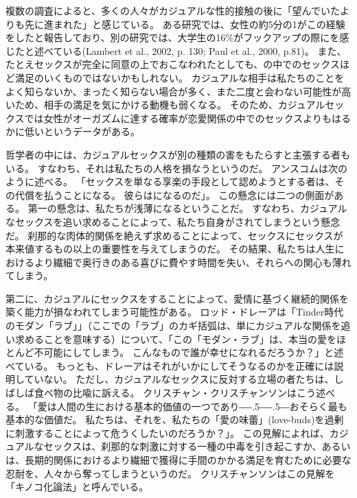 \documentclass[paper=a4,book,openany]{jlreq}
\def\DDASH{―\kern-.5\zw―\kern-.5\zw―} %
\begin{document}
複数の調査によると、多くの人々がカジュアルな性的接触の後に「望んでいたよりも先に進まれた」と感じている。
ある研究では、女性の約5分の1がこの経験をしたと報告しており、別の研究では、大学生の16\%がフックアップの際にを感じたと述べている(Lambert et al., 2002, p. 130; Paul et al., 2000, p.81)。
\nocite{lambert02:_plur_ignor_hook_up}\nocite{paul00:_hook}
また、たとえセックスが完全に同意の上でおこなわれたとしても、の中でのセックスほど満足のいくものではないかもしれない。
カジュアルな相手は私たちのことをよく知らないか、まったく知らない場合が多く、また二度と会わない可能性が高いため、相手の満足を気にかける動機も弱くなる。
そのため、カジュアルセックスでは女性がオーガズムに達する確率が恋愛関係の中でのセックスよりもはるかに低いというデータがある\citep{armstrong10:_orgas_coll_hook_relat}。

哲学者の中には、カジュアルセックスが別の種類の害をもたらすと主張する者もいる。
すなわち、それは私たちの人格を損なうというのだ。
アンスコムは次のように述べる。
「セックスを単なる享楽の手段として認めようとする者は、その代償を払うことになる。
彼らはになるのだ」\citep{anscombe72contraception}。
この懸念には二つの側面がある。
第一の懸念は、私たちが浅薄になるということだ。
すなわち、カジュアルなセックスを追い求めることによって、私たち自身がされてしまうという懸念だ。
刹那的な肉体的関係を絶えず求めることによって、セックスにセックスが本来値するもの以上の重要性を与えてしまうのだ。
その結果、私たちは人生におけるより繊細で奥行きのある喜びに費やす時間を失い、それらへの関心も薄れてしまう。

第二に、カジュアルにセックスをすることによって、愛情に基づく継続的関係を築く能力が損なわれてしまう可能性がある。
ロッド・ドレーアは「Tinder時代のモダン「ラブ」」（ここでの「ラブ」のカギ括弧は、単にカジュアルな関係を追い求めることを意味する）について、「この「モダン・ラブ」は、本当の愛をほとんど不可能にしてしまう。
こんなもので誰が幸せになれるだろうか？」と述べている\citep{dreher15:_moder_love_age_tind}。
もっとも、ドレーアはそれがいかにしてそうなるのかを正確には説明していない。
ただし、カジュアルなセックスに反対する立場の者たちは、しばしば食べ物の比喩に訴える。
クリスチャン・クリスチャンソンはこう述べる。
「愛は人間の生における基本的価値の一つであり{\DDASH}おそらく最も基本的な価値だ。
私たちは、それを、私たちの「愛の味蕾」(love-buds)を過剰に刺激することによって危うくしたいのだろうか？」\citep[p. 105]{krisjansson98:_casual_sex_revis}。
この見解によれば、カジュアルなセックスは、刹那的な刺激に対する一種の中毒を引き起こすか、あるいは、長期的関係におけるより繊細で獲得に手間のかかる満足を育むために必要な忍耐を、人々から奪ってしまうというのだ。
クリスチャンソンはこの見解を「キノコ化論法」と呼んでいる。
\end{document}
